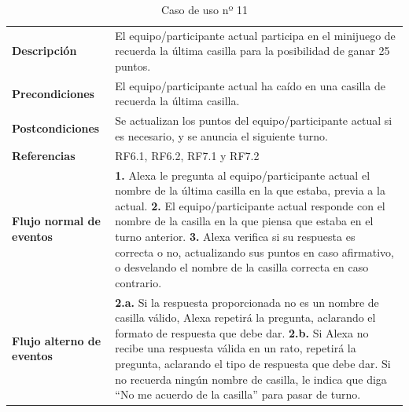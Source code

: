 \begin{table}[H]
	\centering
	\begin{tabular}{|p{3cm}|p{12cm}|}
		\hline
		\rowcolor{lightgray}
		\multicolumn{2}{|c|}{\textbf{CU11}: Minijuego recuerda la última casilla} \\
		\hline
		\textbf{Descripción} & El equipo/participante actual participa en el minijuego de recuerda la última casilla para la posibilidad de ganar 25 puntos. \vspace{0.2cm} \\
		\hline
		\textbf{Precondiciones} & El equipo/participante actual ha caído en una casilla de recuerda la última casilla. \vspace{0.2cm} \\
		\hline
		\textbf{Postcondiciones} & Se actualizan los puntos del equipo/participante actual si es necesario, y se anuncia el siguiente turno. \vspace{0.2cm} \\
		\hline
		\textbf{Referencias} & RF6.1, RF6.2, RF7.1 y RF7.2 \vspace{0.2cm} \\
		\hline
		\textbf{Flujo normal de eventos} &
		\textbf{1.} Alexa le pregunta al equipo/participante actual el nombre de la última casilla en la que estaba, previa a la actual. \newline
		\vspace{0.2cm}
		\textbf{2.} El equipo/participante actual responde con el nombre de la casilla en la que piensa que estaba en el turno anterior. \newline
		\vspace{0.2cm}
		\textbf{3.} Alexa verifica si su respuesta es correcta o no, actualizando sus puntos en caso afirmativo, o desvelando el nombre de la casilla correcta en caso contrario. \newline
		\vspace{0.2cm} \\
		\hline
		\textbf{Flujo alterno de eventos} &
		\textbf{2.a.} Si la respuesta proporcionada no es un nombre de casilla válido, Alexa repetirá la pregunta, aclarando el formato de respuesta que debe dar. \newline
		\vspace{0.2cm} 
		\textbf{2.b.} Si Alexa no recibe una respuesta válida en un rato, repetirá la pregunta, aclarando el tipo de respuesta que debe dar. Si no recuerda ningún nombre de casilla, le indica que diga \enquote{No me acuerdo de la casilla} para pasar de turno.
		\vspace{0.2cm} \\
		\hline
	\end{tabular}
	\caption{Caso de uso nº 11}
	\label{tab:CU11}
\end{table}

